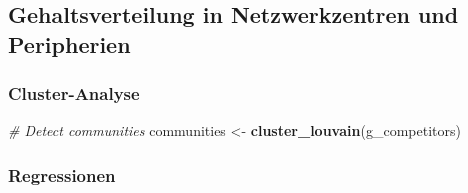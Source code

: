 \documentclass[
]{article}
\newenvironment{Shaded}{\begin{snugshade}}{\end{snugshade}}
\newcommand{\CommentTok}[1]{\textcolor[rgb]{0.56,0.35,0.01}{\textit{#1}}}
\newcommand{\FunctionTok}[1]{\textcolor[rgb]{0.13,0.29,0.53}{\textbf{#1}}}
\newcommand{\NormalTok}[1]{#1}
\newcommand{\OtherTok}[1]{\textcolor[rgb]{0.56,0.35,0.01}{#1}}
\begin{document}
\subsection{Gehaltsverteilung in Netzwerkzentren und
Peripherien}\label{gehaltsverteilung-in-netzwerkzentren-und-peripherien}

\subsubsection{Cluster-Analyse}\label{cluster-analyse}

\begin{Shaded}
\begin{Highlighting}[]
\CommentTok{\# Detect communities}
\NormalTok{communities }\OtherTok{\textless{}{-}} \FunctionTok{cluster\_louvain}\NormalTok{(g\_competitors)}
\end{Highlighting}
\end{Shaded}

\subsubsection{Regressionen}\label{regressionen}
\end{document}
